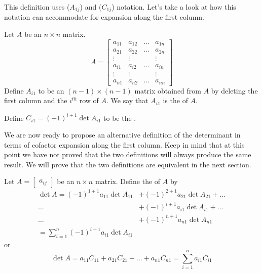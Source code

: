 \documentclass{ximera}
\begin{document}
This definition uses  ($A_{1j}$) and  ($C_{1j}$) notation.  Let's take a look at how this notation can accommodate for expansion along the first column.

Let $A$ be an $n\times n$ matrix. 
$$A=\begin{bmatrix}a_{11} & a_{12} & \dots  & a_{1n}  \\
    a_{21} & a_{22} &\dots  & a_{2n}  \\
   \vdots & \vdots &  & \vdots \\
   a_{i1} & a_{i2} & \dots  & a_{in}\\
   \vdots & \vdots &  & \vdots  \\
   a_{n1} & a_{n2} & \dots  & a_{nn}\end{bmatrix}$$
   Define $A_{i1}$ to be an $(n-1)\times (n-1)$ matrix obtained from $A$ by deleting the first column and the $i^{th}$ row of $A$.  We say that $A_{i1}$ is the  of $A$.
\begin{center}
 \end{center} 
Define $C_{i1}=(-1)^{i+1}\det{A_{i1}}$ to be the
 .

We are now ready to propose an alternative definition of the determinant in terms of cofactor expansion along the first column.  Keep in mind that at this point we have not proved that the two definitions will always produce the same result.  We will prove that the two definitions are equivalent in the next section.

\begin{definition}\label{def:firstcolexpansion1}  Let $A=\begin{bmatrix}a_{ij}\end{bmatrix}$ be an $n\times n$ matrix.  Define the  of $A$ by
\begin{align*}\det{A}=(-1)^{1+1}a_{11}\det{A_{11}}&+(-1)^{2+1}a_{21}\det{A_{21}}+\ldots \\
\ldots &+(-1)^{i+1}a_{i1}\det{A_{i1}}+\ldots \\
\ldots &+(-1)^{n+1}a_{n1}\det{A_{n1}}\\
=\sum_{i=1}^n(-1)^{i+1}a_{i1}\det{A_{i1}}
\end{align*}
or
$$\det{A}=a_{11}C_{11}+a_{21}C_{21}+\ldots +a_{n1}C_{n1}=\sum_{i=1}^n a_{i1}C_{i1}$$
\end{definition}
\end{document}
